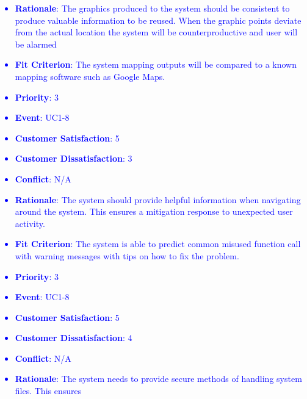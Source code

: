 \documentclass[12pt, titlepage]{article}
\newcounter{reqnum} %
\newcounter{freqnum} %
\begin{document}
\begin{itemize}
\textcolor{blue}{
\item[NFR\refstepcounter{freqnum}\thefreqnum
\label{NFR}:] 
\begin{itemize}
    \item \textbf{Rationale}: The graphics produced to the system should be consistent to produce valuable information to be reused. When the graphic points deviate from the actual location the system will
be counterproductive and user will be alarmed
    \item \textbf{Fit Criterion}: The system mapping outputs will be compared to a known mapping software such as Google Maps. 
    \item \textbf{Priority}: 3
    \item \textbf{Event}: UC1-8%
    \item \textbf{Customer Satisfaction}: 5
    \item \textbf{Customer Dissatisfaction}: 3
    \item \textbf{Conflict}: N/A
\end{itemize}
}
\textcolor{blue}{
\item[NFR\refstepcounter{freqnum}\thefreqnum
\label{NFR}:] 
\begin{itemize}
    \item \textbf{Rationale}: The system should provide helpful information when navigating around the system.
This ensures a mitigation response to unexpected user activity.
    \item \textbf{Fit Criterion}: The system is able to predict common misused function call with warning messages with tips on how to fix the problem.
    \item \textbf{Priority}: 3
    \item \textbf{Event}: UC1-8%
    \item \textbf{Customer Satisfaction}: 5
    \item \textbf{Customer Dissatisfaction}: 4
    \item \textbf{Conflict}: N/A
\end{itemize}
}
\textcolor{blue}{
\item[NFR\refstepcounter{freqnum}\thefreqnum
\label{NFR}:] 
\begin{itemize}
    \item \textbf{Rationale}: The system needs to provide secure methods of handling system files. This ensures

\end{itemize}}
\end{itemize}
\end{document}
